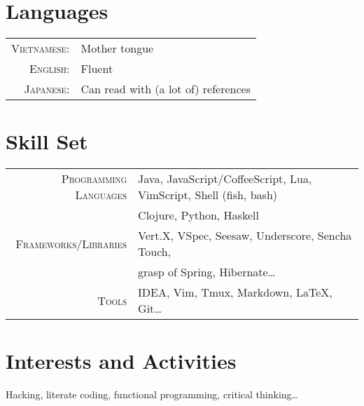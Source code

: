 \documentclass[a4paper,10pt]{article}
\begin{document}
\section{Languages}
\begin{tabular}{rl}
 \textsc{Vietnamese:} & Mother tongue\\
 \textsc{English:} & Fluent\\
 \textsc{Japanese:} & Can read with (a lot of) references\\
\end{tabular}

\section{Skill Set}
\begin{tabular}{rl}
    \textsc{Programming Languages} & Java, JavaScript/CoffeeScript, Lua, VimScript, Shell (fish, bash)\\
                                   & Clojure, Python, Haskell\\
    \textsc{Frameworks/Libraries} & Vert.X, VSpec, Seesaw, Underscore, Sencha Touch,\\
                                  & grasp of Spring, Hibernate\ldots\\
    \textsc{Tools} & IDEA, Vim, Tmux, Markdown, \LaTeX, Git\ldots\\
\end{tabular}

\section{Interests and Activities}
Hacking, literate coding, functional programming, critical thinking\ldots\\


\end{document}
